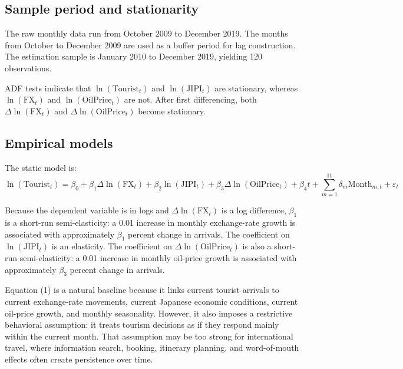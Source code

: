 \documentclass[12pt]{article}
\begin{document}
\subsection{Sample period and stationarity}

The raw monthly data run from October 2009 to December 2019. The months from October to December 2009 are used as a buffer period for lag construction. The estimation sample is January 2010 to December 2019, yielding 120 observations.

ADF tests indicate that $\ln(\mathrm{Tourist}_t)$ and $\ln(\mathrm{JIPI}_t)$ are stationary, whereas $\ln(\mathrm{FX}_t)$ and $\ln(\mathrm{OilPrice}_t)$ are not. After first differencing, both $\Delta \ln(\mathrm{FX}_t)$ and $\Delta \ln(\mathrm{OilPrice}_t)$ become stationary.





\subsection{Empirical models}

The static model is:
\begin{equation}
\ln(\mathrm{Tourist}_t)=\beta_0+\beta_1\Delta\ln(\mathrm{FX}_t)+\beta_2\ln(\mathrm{JIPI}_t)+\beta_3\Delta\ln(\mathrm{OilPrice}_t)+\beta_4 t+\sum_{m=1}^{11}\delta_m\mathrm{Month}_{m,t}+\varepsilon_t
\tag{1}
\end{equation}

Because the dependent variable is in logs and $\Delta \ln(\mathrm{FX}_t)$ is a log difference, $\beta_1$ is a short-run semi-elasticity: a 0.01 increase in monthly exchange-rate growth is associated with approximately $\beta_1$ percent change in arrivals. The coefficient on $\ln(\mathrm{JIPI}_t)$ is an elasticity. The coefficient on $\Delta \ln(\mathrm{OilPrice}_t)$ is also a short-run semi-elasticity: a 0.01 increase in monthly oil-price growth is associated with approximately $\beta_3$ percent change in arrivals.

Equation (1) is a natural baseline because it links current tourist arrivals to current exchange-rate movements, current Japanese economic conditions, current oil-price growth, and monthly seasonality. However, it also imposes a restrictive behavioral assumption: it treats tourism decisions as if they respond mainly within the current month. That assumption may be too strong for international travel, where information search, booking, itinerary planning, and word-of-mouth effects often create persistence over time.
\end{document}
